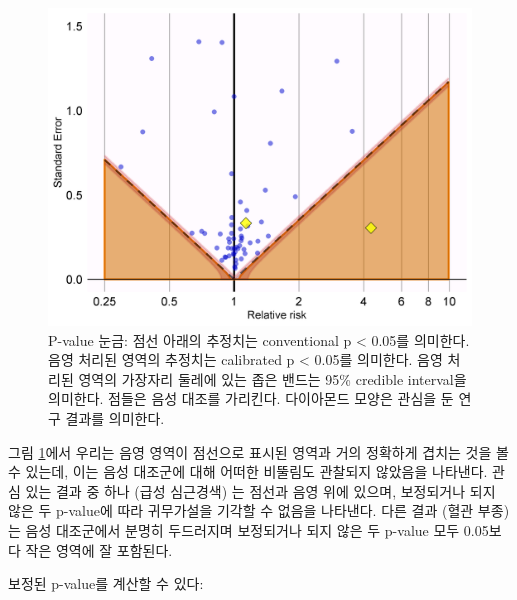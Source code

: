 \documentclass[10.5pt]{book}
\newenvironment{Shaded}{\begin{snugshade}}{\end{snugshade}}
\newcommand{\KeywordTok}[1]{\textcolor[rgb]{0.13,0.29,0.53}{\textbf{#1}}}
\newcommand{\DataTypeTok}[1]{\textcolor[rgb]{0.13,0.29,0.53}{#1}}
\newcommand{\StringTok}[1]{\textcolor[rgb]{0.31,0.60,0.02}{#1}}
\newcommand{\OperatorTok}[1]{\textcolor[rgb]{0.81,0.36,0.00}{\textbf{#1}}}
\newcommand{\NormalTok}[1]{#1}
\theoremstyle{definition}
\theoremstyle{definition}
\theoremstyle{definition}
\theoremstyle{remark}
\begin{document}
\begin{figure}

{\centering \includegraphics[width=0.7\linewidth]{images/MethodValidity/pValueCal} 

}

\caption{P-value 눈금: 점선 아래의 추정치는 conventional p < 0.05를 의미한다. 음영 처리된 영역의 추정치는 calibrated p < 0.05를 의미한다. 음영 처리된 영역의 가장자리 둘레에 있는 좁은 밴드는 95\% credible interval을 의미한다. 점들은 음성 대조를 가리킨다. 다이아몬드 모양은 관심을 둔 연구 결과를 의미한다.}\label{fig:pValueCal}
\end{figure}

그림 \ref{fig:pValueCal}에서 우리는 음영 영역이 점선으로 표시된 영역과
거의 정확하게 겹치는 것을 볼 수 있는데, 이는 음성 대조군에 대해 어떠한
비뚤림도 관찰되지 않았음을 나타낸다. 관심 있는 결과 중 하나 (급성
심근경색) 는 점선과 음영 위에 있으며, 보정되거나 되지 않은 두 p-value에
따라 귀무가설을 기각할 수 없음을 나타낸다. 다른 결과 (혈관 부종) 는 음성
대조군에서 분명히 두드러지며 보정되거나 되지 않은 두 p-value 모두
0.05보다 작은 영역에 잘 포함된다.

보정된 p-value를 계산할 수 있다:

\begin{Shaded}
\end{Shaded}
\end{document}
